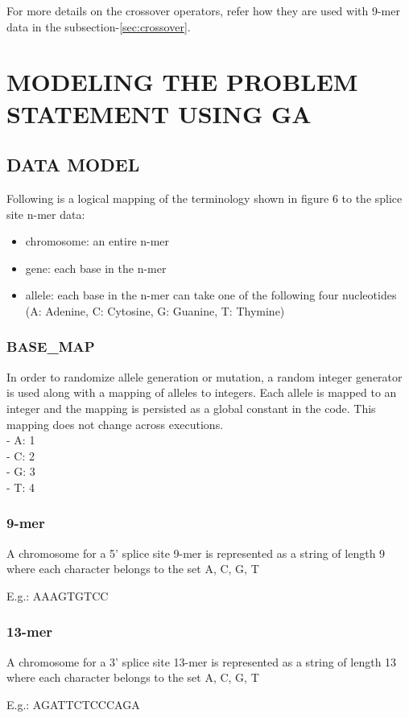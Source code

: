\documentclass[12pt,a4paper]{article}
\begin{document}
	For more details on the crossover operators, refer how they are used with 9-mer data in the subsection-\ref{sec:crossover}.
	
	\section{MODELING THE PROBLEM STATEMENT USING GA} \label{sec:modelling}
	\subsection{DATA MODEL}
	Following is a logical mapping of the terminology shown in figure 6 to the splice site n-mer data:
	\begin{itemize}
		\item chromosome: an entire n-mer
		\item gene: each base in the n-mer
		\item allele: each base in the n-mer can take one of the following four nucleotides (A: Adenine, C: Cytosine, G: Guanine, T: Thymine)
	\end{itemize}
	
	\subsubsection{BASE\_MAP}
	In order to randomize allele generation or mutation, a random integer generator is used along with a mapping of alleles to integers. Each allele is mapped to an integer and the mapping is persisted as a global constant in the code. This mapping does not change across executions. \\
	- A: 1 \\
	- C: 2 \\
	- G: 3 \\
	- T: 4
	\subsubsection{9-mer}
	A chromosome for a 5’ splice site 9-mer is represented as a string of length 9 where each character belongs to the set {A, C, G, T} \par
	E.g.: AAAGTGTCC
	
	\subsubsection{13-mer}
	A chromosome for a 3’ splice site 13-mer is represented as a string of length 13 where each character belongs to the set {A, C, G, T} \par
	E.g.: AGATTCTCCCAGA
	
\end{document}
